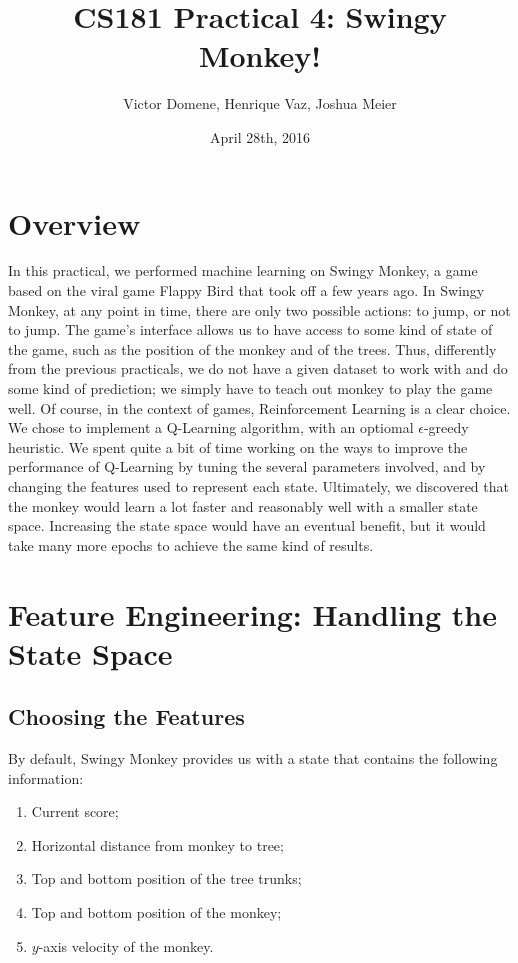 \documentclass[10pt]{article}
\title{CS181 Practical 4: Swingy Monkey!}
\author{Victor Domene, Henrique Vaz, Joshua Meier}
\date{April 28th, 2016}
\begin{document}
\maketitle

\section{Overview} 

In this practical, we performed machine learning on Swingy Monkey, a game
based on the viral game Flappy Bird that took off a few years ago.
In Swingy Monkey, at any point in time, there are only two possible actions:
to jump, or not to jump. The game's interface allows us to have access to
some kind of state of the game, such as the position of the monkey and of
the trees. Thus, differently from the previous practicals, we do not have
a given dataset to work with and do some kind of prediction; we simply have to
teach out monkey to play the game well. Of course, in the context of games,
Reinforcement Learning is a clear choice. We chose to implement a Q-Learning
algorithm, with an optiomal $\epsilon$-greedy heuristic. We spent quite a bit
of time working on the ways to improve the performance of Q-Learning by tuning
the several parameters involved, and by changing the features used to represent
each state. Ultimately, we discovered that the monkey would learn a lot faster
and reasonably well with a smaller state space. Increasing the state space
would have an eventual benefit, but it would take many more epochs to achieve
the same kind of results.

\medskip

\section{Feature Engineering: Handling the State Space} 

\subsection{Choosing the Features}

By default, Swingy Monkey provides us with a state that contains the following
information:

\medskip

\begin{enumerate}
\item Current score;
\item Horizontal distance from monkey to tree;
\item Top and bottom position of the tree trunks;
\item Top and bottom position of the monkey;
\item $y$-axis velocity of the monkey.
\end{enumerate}
\end{document}
